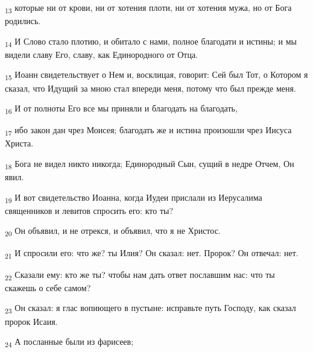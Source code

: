 \begin{tcolorbox}
\textsubscript{13} которые ни от крови, ни от хотения плоти, ни от хотения мужа, но от Бога родились.
\end{tcolorbox}
\begin{tcolorbox}
\textsubscript{14} И Слово стало плотию, и обитало с нами, полное благодати и истины; и мы видели славу Его, славу, как Единородного от Отца.
\end{tcolorbox}
\begin{tcolorbox}
\textsubscript{15} Иоанн свидетельствует о Нем и, восклицая, говорит: Сей был Тот, о Котором я сказал, что Идущий за мною стал впереди меня, потому что был прежде меня.
\end{tcolorbox}
\begin{tcolorbox}
\textsubscript{16} И от полноты Его все мы приняли и благодать на благодать,
\end{tcolorbox}
\begin{tcolorbox}
\textsubscript{17} ибо закон дан чрез Моисея; благодать же и истина произошли чрез Иисуса Христа.
\end{tcolorbox}
\begin{tcolorbox}
\textsubscript{18} Бога не видел никто никогда; Единородный Сын, сущий в недре Отчем, Он явил.
\end{tcolorbox}
\begin{tcolorbox}
\textsubscript{19} И вот свидетельство Иоанна, когда Иудеи прислали из Иерусалима священников и левитов спросить его: кто ты?
\end{tcolorbox}
\begin{tcolorbox}
\textsubscript{20} Он объявил, и не отрекся, и объявил, что я не Христос.
\end{tcolorbox}
\begin{tcolorbox}
\textsubscript{21} И спросили его: что же? ты Илия? Он сказал: нет. Пророк? Он отвечал: нет.
\end{tcolorbox}
\begin{tcolorbox}
\textsubscript{22} Сказали ему: кто же ты? чтобы нам дать ответ пославшим нас: что ты скажешь о себе самом?
\end{tcolorbox}
\begin{tcolorbox}
\textsubscript{23} Он сказал: я глас вопиющего в пустыне: исправьте путь Господу, как сказал пророк Исаия.
\end{tcolorbox}
\begin{tcolorbox}
\textsubscript{24} А посланные были из фарисеев;
\end{tcolorbox}
